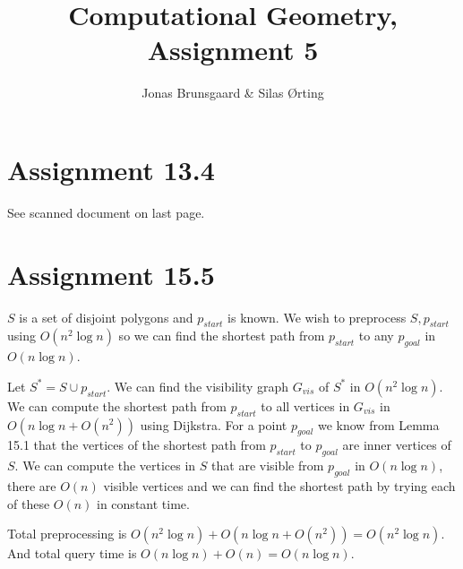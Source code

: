 \documentclass[10pt,a4paper,final,oneside,openany,article,oldfontcommands]{memoir}
\title{Computational Geometry, Assignment 5}
\author{
    Jonas Brunsgaard \& Silas Ørting
}
\begin{document}
\maketitle


\chapter*{Assignment 13.4}
See scanned document on last page.

\chapter*{Assignment 15.5}
$S$ is a set of disjoint polygons and $p_{start}$ is known. We wish to preprocess $S, p_{start}$ using $O(n^2 \log n)$ so we can find the shortest path from $p_{start}$ to any $p_{goal}$ in $O(n \log n)$. 

Let $S^{*} = S \cup p_{start}$. We can find the visibility graph $G_{vis}$ of $S^{*}$ in $O(n^2 \log n)$. We can compute the shortest path from $p_{start}$ to all vertices in $G_{vis}$ in $O(n \log n + O(n^2))$ using Dijkstra. For a point $p_{goal}$ we know from Lemma 15.1 that the vertices of the shortest path from $p_{start}$ to $p_{goal}$ are inner vertices of $S$. We can compute the vertices in $S$ that are visible from $p_{goal}$ in $O(n \log n)$, there are $O(n)$ visible vertices and we can find the shortest path by trying each of these $O(n)$ in constant time. 

Total preprocessing is $O(n^2 \log n) + O(n \log n + O(n^2)) = O(n^2 \log n)$. And total query time is $O(n \log n) + O(n) = O(n \log n)$.


\end{document}
